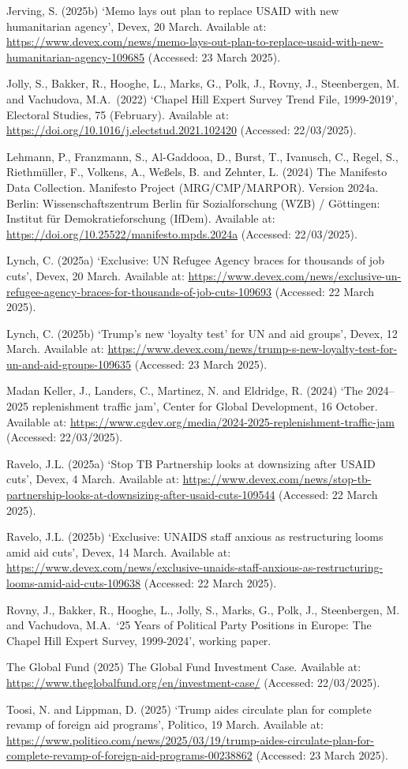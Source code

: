 \documentclass[
]{article}
\begin{document}
Jerving, S. (2025b) `Memo lays out plan to replace USAID with new
humanitarian agency', Devex, 20 March. Available at:
\url{https://www.devex.com/news/memo-lays-out-plan-to-replace-usaid-with-new-humanitarian-agency-109685}
(Accessed: 23 March 2025).

Jolly, S., Bakker, R., Hooghe, L., Marks, G., Polk, J., Rovny, J.,
Steenbergen, M. and Vachudova, M.A.~(2022) `Chapel Hill Expert Survey
Trend File, 1999-2019', Electoral Studies, 75 (February). Available at:
\url{https://doi.org/10.1016/j.electstud.2021.102420} (Accessed:
22/03/2025).

Lehmann, P., Franzmann, S., Al-Gaddooa, D., Burst, T., Ivanusch, C.,
Regel, S., Riethmüller, F., Volkens, A., Weßels, B. and Zehnter, L.
(2024) The Manifesto Data Collection. Manifesto Project
(MRG/CMP/MARPOR). Version 2024a. Berlin: Wissenschaftszentrum Berlin für
Sozialforschung (WZB) / Göttingen: Institut für Demokratieforschung
(IfDem). Available at:
\url{https://doi.org/10.25522/manifesto.mpds.2024a} (Accessed:
22/03/2025).

Lynch, C. (2025a) `Exclusive: UN Refugee Agency braces for thousands of
job cuts', Devex, 20 March. Available at:
\url{https://www.devex.com/news/exclusive-un-refugee-agency-braces-for-thousands-of-job-cuts-109693}
(Accessed: 22 March 2025).

Lynch, C. (2025b) `Trump's new `loyalty test' for UN and aid groups',
Devex, 12 March. Available at:
\url{https://www.devex.com/news/trump-s-new-loyalty-test-for-un-and-aid-groups-109635}
(Accessed: 23 March 2025).

Madan Keller, J., Landers, C., Martinez, N. and Eldridge, R. (2024) `The
2024--2025 replenishment traffic jam', Center for Global Development, 16
October. Available at:
\url{https://www.cgdev.org/media/2024-2025-replenishment-traffic-jam}
(Accessed: 22/03/2025).

Ravelo, J.L. (2025a) `Stop TB Partnership looks at downsizing after
USAID cuts', Devex, 4 March. Available at:
\url{https://www.devex.com/news/stop-tb-partnership-looks-at-downsizing-after-usaid-cuts-109544}
(Accessed: 22 March 2025).

Ravelo, J.L. (2025b) `Exclusive: UNAIDS staff anxious as restructuring
looms amid aid cuts', Devex, 14 March. Available at:
\url{https://www.devex.com/news/exclusive-unaids-staff-anxious-as-restructuring-looms-amid-aid-cuts-109638}
(Accessed: 22 March 2025).

Rovny, J., Bakker, R., Hooghe, L., Jolly, S., Marks, G., Polk, J.,
Steenbergen, M. and Vachudova, M.A.~`25 Years of Political Party
Positions in Europe: The Chapel Hill Expert Survey, 1999-2024', working
paper.

The Global Fund (2025) The Global Fund Investment Case. Available at:
\url{https://www.theglobalfund.org/en/investment-case/} (Accessed:
22/03/2025).

Toosi, N. and Lippman, D. (2025) `Trump aides circulate plan for
complete revamp of foreign aid programs', Politico, 19 March. Available
at:
\url{https://www.politico.com/news/2025/03/19/trump-aides-circulate-plan-for-complete-revamp-of-foreign-aid-programs-00238862}
(Accessed: 23 March 2025).
\end{document}
